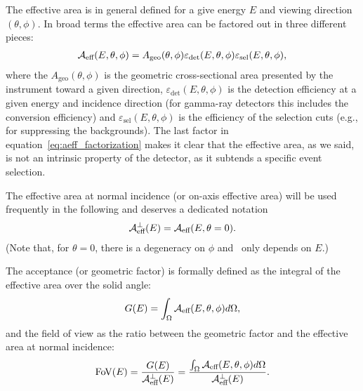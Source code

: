 The effective area is in general defined for a give energy $E$ and viewing
direction $(\theta, \phi)$. In broad terms the effective area can
be factored out in three different pieces:
\begin{align}\label{eq:aeff_factorization}
  \mathcal{A}_\text{eff}(E, \theta, \phi) =
  A_\text{geo}(\theta, \phi)
  \varepsilon_\text{det}(E, \theta, \phi)
  \varepsilon_\text{sel}(E, \theta, \phi),
\end{align}
where the $A_\text{geo}(\theta, \phi)$ is the geometric cross-sectional area
presented by the instrument toward a given direction,
$\varepsilon_\text{det}(E, \theta, \phi)$ is the detection efficiency at a given
energy and incidence direction (for gamma-ray detectors this includes the
conversion efficiency) and $\varepsilon_\text{sel}(E, \theta, \phi)$ is the
efficiency of the selection cuts (e.g., for suppressing the backgrounds).
The last factor in equation~\eqref{eq:aeff_factorization} makes it clear that
the effective area, as we said, is not an intrinsic property of the detector, as
it subtends a specific event selection.

The effective area at normal incidence (or on-axis effective area)
will be used frequently in the following and deserves a dedicated notation
\begin{align}
  \mathcal{A}_\text{eff}^{\perp}(E) = \mathcal{A}_\text{eff}(E, \theta = 0).
\end{align}
(Note that, for $\theta = 0$, there is a degeneracy on $\phi$ and \aeff\
only depends on $E$.)

The acceptance (or geometric factor) is formally defined as the integral
of the effective area over the solid angle:
\begin{align}
  G(E) = \int_{\Omega}\mathcal{A}_\text{eff}(E, \theta, \phi) d\Omega,
\end{align}
and the field of view as the ratio between the geometric factor and the
effective area at normal incidence:
\begin{align}
  \text{Fo\kern-1ptV}(E) = \frac{G(E)}{\mathcal{A}_\text{eff}^{\perp}(E)} =
  \frac{\int_{\Omega}\mathcal{A}_\text{eff}(E, \theta, \phi) d\Omega}{\mathcal{A}_\text{eff}^{\perp}(E)}.
\end{align}

